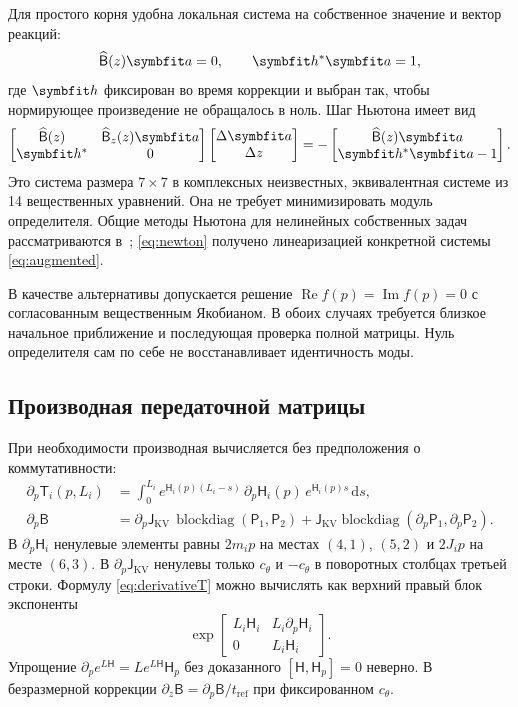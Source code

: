\documentclass[11pt,a4paper]{article}
\numberwithin{equation}{section}
\newcommand{\dd}{\,\mathrm d}
\newcommand{\cth}{c_\theta}
\newcommand{\BB}{\mathsf B}
\newcommand{\JJ}{\mathsf J}
\newcommand{\HH}{\mathsf H}
\newcommand{\TT}{\mathsf T}
\newcommand{\PP}{\mathsf P}
\newcommand{\refsub}{\mathrm{ref}}
\newcommand{\tref}{t_{\refsub}}
\begin{document}
Для простого корня удобна локальная система на собственное значение
и вектор реакций:
\begin{equation}
 \widehat{\BB}(z)\symbfit a=0,\qquad
 \symbfit h^*\symbfit a=1,
 \label{eq:augmented}
\end{equation}
где $\symbfit h$ фиксирован во время коррекции и выбран так, чтобы
нормирующее произведение не обращалось в ноль. Шаг Ньютона имеет вид
\begin{equation}
 \begin{bmatrix}
 \widehat{\BB}(z)&\widehat{\BB}_z(z)\symbfit a\\
 \symbfit h^*&0
 \end{bmatrix}
 \begin{bmatrix}\Delta\symbfit a\\\Delta z\end{bmatrix}
 =-
 \begin{bmatrix}\widehat{\BB}(z)\symbfit a\\
 \symbfit h^*\symbfit a-1\end{bmatrix}.
 \label{eq:newton}
\end{equation}
Это система размера $7\times7$ в комплексных неизвестных, эквивалентная
системе из 14 вещественных уравнений. Она не требует минимизировать
модуль определителя. Общие методы Ньютона для нелинейных собственных
задач рассматриваются в~\cite{guettel2017}; \eqref{eq:newton} получено
линеаризацией конкретной системы \eqref{eq:augmented}.

В качестве альтернативы допускается решение
$\operatorname{Re}f(p)=\operatorname{Im}f(p)=0$ с согласованным
вещественным Якобианом. В обоих случаях требуется близкое начальное
приближение и последующая проверка полной матрицы. Нуль определителя
сам по себе не восстанавливает идентичность моды.

\subsection{Производная передаточной матрицы}

При необходимости производная вычисляется без предположения о
коммутативности:
\begin{align}
 \partial_p\TT_i(p,L_i)
 &=\int_0^{L_i}e^{\HH_i(p)(L_i-s)}\,
       \partial_p\HH_i(p)\,e^{\HH_i(p)s}\dd s,\label{eq:derivativeT}\\
 \partial_p\BB
 &=\partial_p\JJ_{\mathrm{KV}}\,\operatorname{blockdiag}(\PP_1,\PP_2)
 +\JJ_{\mathrm{KV}}\operatorname{blockdiag}(\partial_p\PP_1,\partial_p\PP_2).
 \label{eq:derivativeB}
\end{align}
В $\partial_p\HH_i$ ненулевые элементы равны $2m_ip$ на местах $(4,1)$,
$(5,2)$ и $2J_ip$ на месте $(6,3)$. В $\partial_p\JJ_{\mathrm{KV}}$
ненулевы только $\cth$ и $-\cth$ в поворотных столбцах третьей строки.
Формулу \eqref{eq:derivativeT} можно вычислять как верхний правый блок
экспоненты
\[
 \exp\begin{bmatrix}
 L_i\HH_i&L_i\partial_p\HH_i\\0&L_i\HH_i
 \end{bmatrix}.
\]
Упрощение $\partial_p e^{L\HH}=Le^{L\HH}\HH_p$ без доказанного
$[\HH,\HH_p]=0$ неверно. В безразмерной коррекции
$\partial_z\BB=\partial_p\BB/\tref$ при фиксированном $\cth$.
\end{document}
